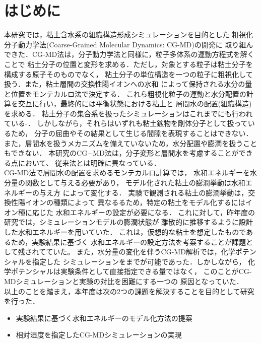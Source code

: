 \section{はじめに}
本研究では，粘土含水系の組織構造形成シミュレーションを目的とした
粗視化分子動力学法(Coarse-Grained Molecular Dynamics: CG-MD)の開発に
取り組んできた．CG-MD法は，分子動力学法と同様に，粒子多体系の運動方程式を解くことで
粘土分子の位置と変形を求める．ただし，対象とする粒子は粘土分子を構成する原子そのものでなく，
粘土分子の単位構造を一つの粒子に粗視化して扱う．また，粘土層間の交換性陽イオンへの水和
によって保持される水分の量と位置をモンテカルロ法で決定する．
これら粗視化粒子の運動と水分配置の計算を交互に行い，最終的には平衡状態における粘土と
層間水の配置(組織構造)を求める．
粘土分子の集合系を扱ったシミュレーションはこれまでにも行われている\cite{Eb2014}-\cite{Katti}．
しかしながら，それらはいずれも粘土鉱物を剛体分子として扱っているため，
分子の屈曲やその結果として生じる間隙を表現することはできない．
また，層間水を扱うメカニズムを備えていないため，水分配置や膨潤を扱うこともできない．
本研究のCG−MD法は，分子変形と層間水を考慮することができる点において、
従来法とは明確に異なっている．
\\
\hspace{\parindent}
CG-MD法で層間水の配置を求めるモンテカルロ計算では，
水和エネルギーを水分量の関数として与える必要があり，
モデル化された粘土の膨潤挙動は水和エネルギーの与え方
によって変化する．
実験で観測される粘土の膨潤挙動は，交換性陽イオンの種類によって
異なるるため，特定の粘土をモデル化するにはイオン種に応じた
水和エネルギーの設定が必要になる．
これに対して，昨年度の研究では，シミュレーションモデルの膨潤状態が
離散的に推移するように設計した水和エネルギーを用いていた．
これは，仮想的な粘土を想定したものであるため，実験結果に基づく
水和エネルギーの設定方法を考案することが課題として残されてていた。
また，水分量の変化を伴うCG-MD解析では，化学ポテンシャルを指定した
シミュレーションをまでが可能であった．しかしながら，
化学ポテンシャルは実験条件として直接指定できる量ではなく，
このことがCG-MDシミュレーションと実験の対比を困難にする一つの
原因となっていた．\\
\hspace{\parindent}
以上のことを踏まえ，本年度は次の2つの課題を解決することを目的として研究を行った．
\begin{itemize}
\item
	実験結果に基づく水和エネルギーのモデル化方法の提案
\item
	相対湿度を指定したCG-MDシミュレーションの実現
\end{itemize}
